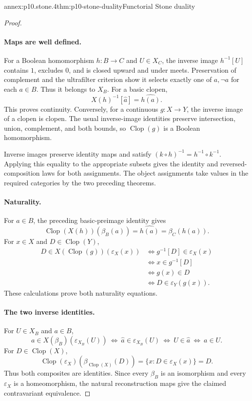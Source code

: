 \begin{annexitem}{annex:p10.stone.4}{thm:p10-stone-duality}{Functorial Stone duality}
\begin{proof}
\paragraph{Maps are well defined.}
For a Boolean homomorphism \(h:B\to C\) and \(U\in X_C\),
the inverse image \(h^{-1}[U]\) contains \(1\), excludes \(0\),
and is closed upward and under meets.
Preservation of complement and the ultrafilter criterion show
it selects exactly one of \(a,\neg a\) for each \(a\in B\).
Thus it belongs to \(X_B\).
For a basic clopen,
\[
 X(h)^{-1}[\widehat a]=\widehat{h(a)}.
\]
This proves continuity.
Conversely, for a continuous \(g:X\to Y\), the inverse image of a
clopen is clopen. The usual inverse-image identities preserve
intersection, union, complement, and both bounds, so
\(\operatorname{Clop}(g)\) is a Boolean homomorphism.

Inverse images preserve identity maps and satisfy
\((k\circ h)^{-1}=h^{-1}\circ k^{-1}\).
Applying this equality to the appropriate subsets gives the
identity and reversed-composition laws for both assignments.
The object assignments take values in the required categories by
the two preceding theorems.

\paragraph{Naturality.}
For \(a\in B\), the preceding basic-preimage identity gives
\[
 \operatorname{Clop}(X(h))(\beta_B(a))
     =\widehat{h(a)}=\beta_C(h(a)).
\]
For \(x\in X\) and \(D\in\operatorname{Clop}(Y)\),
\[
\begin{aligned}
 D\in X(\operatorname{Clop}(g))(\varepsilon_X(x))
 &\Longleftrightarrow g^{-1}[D]\in\varepsilon_X(x)\\
 &\Longleftrightarrow x\in g^{-1}[D]\\
 &\Longleftrightarrow g(x)\in D\\
 &\Longleftrightarrow D\in\varepsilon_Y(g(x)).
\end{aligned}
\]
These calculations prove both naturality equations.

\paragraph{The two inverse identities.}
For \(U\in X_B\) and \(a\in B\),
\[
 a\in X(\beta_B)(\varepsilon_{X_B}(U))
 \ \Longleftrightarrow\ 
 \widehat a\in\varepsilon_{X_B}(U)
 \ \Longleftrightarrow\ U\in\widehat a
 \ \Longleftrightarrow\ a\in U.
\]
For \(D\in\operatorname{Clop}(X)\),
\[
 \operatorname{Clop}(\varepsilon_X)
       (\beta_{\operatorname{Clop}(X)}(D))
   =\{x:D\in\varepsilon_X(x)\}=D.
\]
Thus both composites are identities.
Since every \(\beta_B\) is an isomorphism and every
\(\varepsilon_X\) is a homeomorphism, the natural reconstruction
maps give the claimed contravariant equivalence.


\end{proof}
\end{annexitem}
